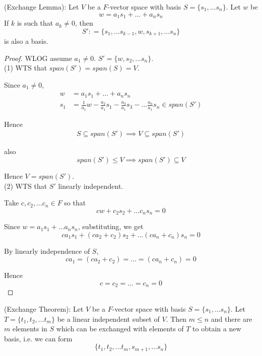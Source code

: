 \begin{lemma}
(Exchange Lemma): Let $V$ be a $F$-vector space with basis $S = \{ s_1, \hdots s_n \} $. Let $w$ be 
    \[
      w = a_1 s_1 + \hdots + a_n s_n
    \]
    If $k$ is such that $a_k \neq 0$, then 
    \[
      S': = \{ s_1, \hdots s_{k - 1}, w, s_{k + 1}, \hdots s_n \} 
    \]
    is also a basis.
\end{lemma} 

\begin{proof}
WLOG assume $a_1 \neq 0$. $S' = \{ w, s_2, \hdots s_n \} $. \\

(1) WTS that $span(S') = span(S) = V$.

Since $a_1 \neq 0$, 
\begin{align*}
    w &= a_1 s_1 + \hdots + a_n s_n \\
    s_1 &= \frac{1}{a_1} w - \frac{a_2}{a_1}s_1 - \frac{a_3}{a_1} s_3 - \hdots \frac{a_n}{a_1} s_n \in span(S')
\end{align*}

Hence 
\begin{align*}
    S \subseteq span(S') \implies V \subseteq span(S')
\end{align*}

also
\[
  span(S') \leq V \implies span(S') \subseteq V
\]

Hence $V = span(S')$.\\


(2) WTS that $S'$  linearly independent.

Take $c, c_2, \hdots c_n \in F$ so that 
\[
  cw + c_2 s_2 + \hdots c_n s_n = 0
\]

Since $w = a_1 s_1 + \hdots a_n s_n$, substituting, we get
\[
  ca_1 s_1 + (ca_2 + c_2) s_2 + \hdots (ca_n + c_n) s_n = 0
\]

By linearly independence of $S$, 
\[
  ca_1 = (ca_2 + c_2) = \hdots = (ca_n + c_n) = 0
\]

Hence 
\[
  c = c_2 = \hdots = c_n = 0
\]
\end{proof}


\begin{theorem}
(Exchange Theorem): Let $V$ be a $F$-vector space with basis $S = \{ s_1, \hdots s_n \} $. Let $T = \{ t_1, t_2, \hdots t_m \} $ be a linear independent subset of $V$. Then $m \leq n$ and there are $m$ elements in $S$ which can be exchanged with elements of $T$ to obtain a new basis, i.e. we can form 
    \[
    \{ t_1, t_2, \hdots t_m, s_{m + 1}, \hdots s_n \} 
    \]
\end{theorem} 

